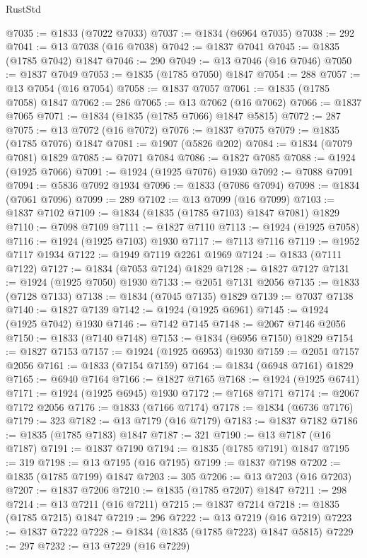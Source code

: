 \begin{lexlean}{RustStd}
\begin{coremodule}
@7035 := @1833 (@7022 @7033)
@7037 := @1834 (@6964 @7035)
@7038 := 292
@7041 := @13 @7038 (@16 @7038)
@7042 := @1837 @7041
@7045 := @1835 (@1785 @7042) @1847
@7046 := 290
@7049 := @13 @7046 (@16 @7046)
@7050 := @1837 @7049
@7053 := @1835 (@1785 @7050) @1847
@7054 := 288
@7057 := @13 @7054 (@16 @7054)
@7058 := @1837 @7057
@7061 := @1835 (@1785 @7058) @1847
@7062 := 286
@7065 := @13 @7062 (@16 @7062)
@7066 := @1837 @7065
@7071 := @1834 (@1835 (@1785 @7066) @1847 @5815)
@7072 := 287
@7075 := @13 @7072 (@16 @7072)
@7076 := @1837 @7075
@7079 := @1835 (@1785 @7076) @1847
@7081 := @1907 (@5826 @202)
@7084 := @1834 (@7079 @7081) @1829
@7085 := @7071 @7084
@7086 := @1827 @7085
@7088 := @1924 (@1925 @7066)
@7091 := @1924 (@1925 @7076) @1930
@7092 := @7088 @7091
@7094 := @5836 @7092 @1934
@7096 := @1833 (@7086 @7094)
@7098 := @1834 (@7061 @7096)
@7099 := 289
@7102 := @13 @7099 (@16 @7099)
@7103 := @1837 @7102
@7109 := @1834 (@1835 (@1785 @7103) @1847 @7081) @1829
@7110 := @7098 @7109
@7111 := @1827 @7110
@7113 := @1924 (@1925 @7058)
@7116 := @1924 (@1925 @7103) @1930
@7117 := @7113 @7116
@7119 := @1952 @7117 @1934
@7122 := @1949 @7119 @2261 @1969
@7124 := @1833 (@7111 @7122)
@7127 := @1834 (@7053 @7124) @1829
@7128 := @1827 @7127
@7131 := @1924 (@1925 @7050) @1930
@7133 := @2051 @7131 @2056
@7135 := @1833 (@7128 @7133)
@7138 := @1834 (@7045 @7135) @1829
@7139 := @7037 @7138
@7140 := @1827 @7139
@7142 := @1924 (@1925 @6961)
@7145 := @1924 (@1925 @7042) @1930
@7146 := @7142 @7145
@7148 := @2067 @7146 @2056
@7150 := @1833 (@7140 @7148)
@7153 := @1834 (@6956 @7150) @1829
@7154 := @1827 @7153
@7157 := @1924 (@1925 @6953) @1930
@7159 := @2051 @7157 @2056
@7161 := @1833 (@7154 @7159)
@7164 := @1834 (@6948 @7161) @1829
@7165 := @6940 @7164
@7166 := @1827 @7165
@7168 := @1924 (@1925 @6741)
@7171 := @1924 (@1925 @6945) @1930
@7172 := @7168 @7171
@7174 := @2067 @7172 @2056
@7176 := @1833 (@7166 @7174)
@7178 := @1834 (@6736 @7176)
@7179 := 323
@7182 := @13 @7179 (@16 @7179)
@7183 := @1837 @7182
@7186 := @1835 (@1785 @7183) @1847
@7187 := 321
@7190 := @13 @7187 (@16 @7187)
@7191 := @1837 @7190
@7194 := @1835 (@1785 @7191) @1847
@7195 := 319
@7198 := @13 @7195 (@16 @7195)
@7199 := @1837 @7198
@7202 := @1835 (@1785 @7199) @1847
@7203 := 305
@7206 := @13 @7203 (@16 @7203)
@7207 := @1837 @7206
@7210 := @1835 (@1785 @7207) @1847
@7211 := 298
@7214 := @13 @7211 (@16 @7211)
@7215 := @1837 @7214
@7218 := @1835 (@1785 @7215) @1847
@7219 := 296
@7222 := @13 @7219 (@16 @7219)
@7223 := @1837 @7222
@7228 := @1834 (@1835 (@1785 @7223) @1847 @5815)
@7229 := 297
@7232 := @13 @7229 (@16 @7229)

\end{coremodule}
\end{lexlean}
